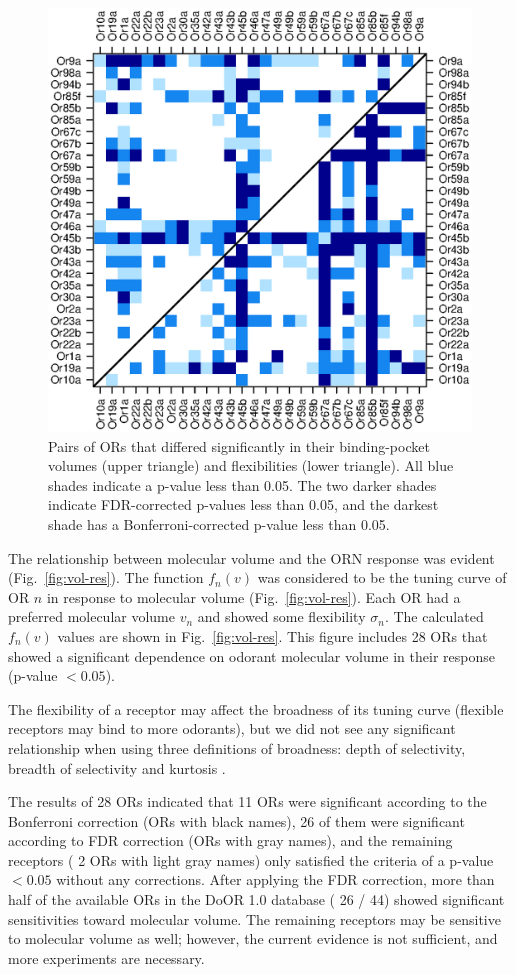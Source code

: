 \documentclass[fleqn,11pt]{wlscirep}
\newcommand{\numberofreceptors}{ 28 }
\newcommand{\bonferroni}{ 11 }
\newcommand{\fdr}{ 26 }
\newcommand{\nocorrection}{ 2 }
\begin{document}
\begin{figure}
	\centering
	\includegraphics[width= 0.75 \textwidth]{pair-pval}
	\caption{Pairs of ORs that differed significantly in their binding-pocket volumes (upper triangle) and flexibilities (lower triangle).
			All blue shades indicate a p-value less than 0.05. 
			The two darker shades indicate FDR-corrected p-values less than 0.05, and the darkest shade has a Bonferroni-corrected p-value less than 0.05.}
	\label{fig:p-values}
\end{figure}

The relationship between molecular volume and the ORN response was evident (Fig.~\ref{fig:vol-res}). 
The function $f_n(v)$ was considered to be the tuning curve of OR $n$ in response to molecular volume (Fig.~\ref{fig:vol-res}). 
Each OR had a preferred molecular volume $v_n$ and showed some flexibility $\sigma_n$. 
The calculated $f_n(v)$ values are shown in Fig.~\ref{fig:vol-res}. 
This figure includes \numberofreceptors ORs 
that showed a significant dependence on odorant molecular volume in their response (p-value $<0.05$). 

The flexibility of a receptor may affect the broadness of its tuning curve (flexible receptors may bind to more odorants), 
but we did not see any significant relationship when 
using three definitions of broadness: depth of selectivity, breadth of selectivity and kurtosis \cite{moody1998model,freedman2006experience,muench2015door}.

The results of \numberofreceptors ORs indicated that 
\bonferroni ORs were significant according to the Bonferroni correction (ORs with black names), 
\fdr of them were significant according to FDR correction (ORs with gray names), 
and the remaining receptors (\nocorrection ORs with light gray names) 
only satisfied the criteria of a p-value $<0.05$ without any corrections.
After applying the FDR correction, 
more than half of the available ORs in the DoOR 1.0 database (\fdr / 44) showed significant sensitivities toward molecular volume. 
The remaining receptors may be sensitive to molecular volume as well; however, 
the current evidence is not sufficient, and more experiments are necessary. 
\end{document}
